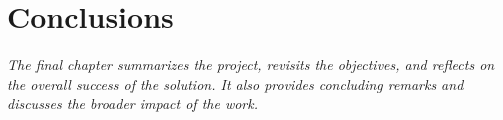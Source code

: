 \chapter{Conclusions}

\begin{center}
    \textit{The final chapter summarizes the project, revisits the objectives, and reflects on the overall success of the solution. It also provides concluding remarks and discusses the broader impact of the work.}
\end{center}